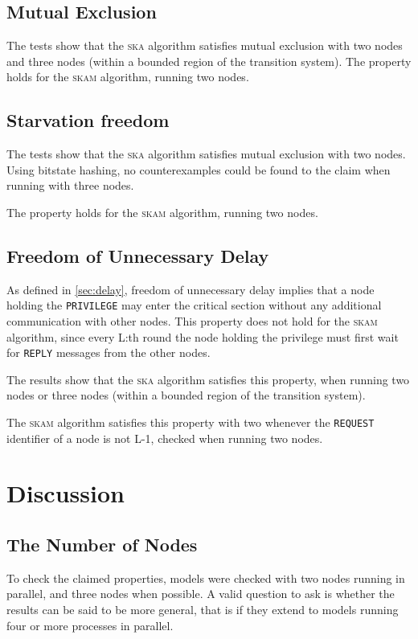 \documentclass[a4paper,10pt]{llncs}
\begin{document}
\subsection{Mutual Exclusion}
The tests show that the \textsc{ska} algorithm satisfies mutual exclusion with two nodes and three nodes (within a bounded region of the transition system). The property holds for the \textsc{skam} algorithm, running two nodes.

\subsection{Starvation freedom}
The tests show that the \textsc{ska} algorithm satisfies mutual exclusion with two nodes. Using bitstate hashing, no counterexamples could be found to the claim when running with three nodes.

The property holds for the \textsc{skam} algorithm, running two nodes.

\subsection{Freedom of Unnecessary Delay}
As defined in \ref{sec:delay}, freedom of unnecessary delay implies that a node holding the \texttt{PRIVILEGE} may enter the critical section without any additional communication with other nodes. This property does not hold for the \textsc{skam} algorithm, since every L:th round the node holding the privilege must first wait for \texttt{REPLY} messages from the other nodes.

The results show that the \textsc{ska} algorithm satisfies this property, when running two nodes or three nodes (within a bounded region of the transition system).

The \textsc{skam} algorithm satisfies this property with two whenever the \texttt{REQUEST} identifier of a node is not L-1, checked when running two nodes.

\section{Discussion}
\subsection{The Number of Nodes}
To check the claimed properties, models were checked with two nodes running in parallel, and three nodes when possible. A valid question to ask is whether the results can be said to be more general, that is if they extend to models running four or more processes in parallel.
\end{document}
